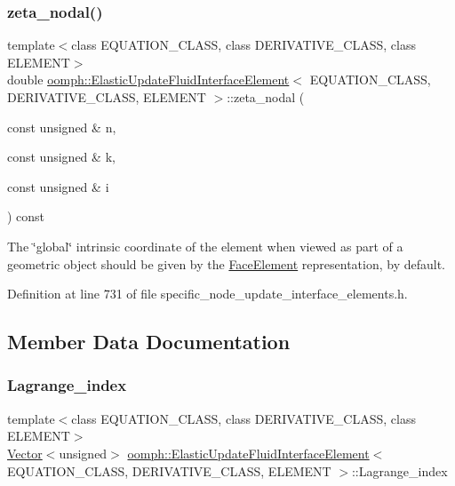 \subsubsection{\texorpdfstring{zeta\+\_\+nodal()}{zeta\_nodal()}}
{\footnotesize\ttfamily template$<$class E\+Q\+U\+A\+T\+I\+O\+N\+\_\+\+C\+L\+A\+SS, class D\+E\+R\+I\+V\+A\+T\+I\+V\+E\+\_\+\+C\+L\+A\+SS, class E\+L\+E\+M\+E\+NT$>$ \\
double \hyperlink{classoomph_1_1ElasticUpdateFluidInterfaceElement}{oomph\+::\+Elastic\+Update\+Fluid\+Interface\+Element}$<$ E\+Q\+U\+A\+T\+I\+O\+N\+\_\+\+C\+L\+A\+SS, D\+E\+R\+I\+V\+A\+T\+I\+V\+E\+\_\+\+C\+L\+A\+SS, E\+L\+E\+M\+E\+NT $>$\+::zeta\+\_\+nodal (\begin{DoxyParamCaption}\item[{const unsigned \&}]{n,  }\item[{const unsigned \&}]{k,  }\item[{const unsigned \&}]{i }\end{DoxyParamCaption}) const\hspace{0.3cm}{\ttfamily [inline]}}



The \char`\"{}global\char`\"{} intrinsic coordinate of the element when viewed as part of a geometric object should be given by the \hyperlink{classoomph_1_1FaceElement}{Face\+Element} representation, by default. 



Definition at line 731 of file specific\+\_\+node\+\_\+update\+\_\+interface\+\_\+elements.\+h.



\subsection{Member Data Documentation}
\mbox{\label{classoomph_1_1ElasticUpdateFluidInterfaceElement_a7852050a89e3aac51ed3693814be9018}} 
\subsubsection{\texorpdfstring{Lagrange\+\_\+index}{Lagrange\_index}}
{\footnotesize\ttfamily template$<$class E\+Q\+U\+A\+T\+I\+O\+N\+\_\+\+C\+L\+A\+SS, class D\+E\+R\+I\+V\+A\+T\+I\+V\+E\+\_\+\+C\+L\+A\+SS, class E\+L\+E\+M\+E\+NT$>$ \\
\hyperlink{classoomph_1_1Vector}{Vector}$<$unsigned$>$ \hyperlink{classoomph_1_1ElasticUpdateFluidInterfaceElement}{oomph\+::\+Elastic\+Update\+Fluid\+Interface\+Element}$<$ E\+Q\+U\+A\+T\+I\+O\+N\+\_\+\+C\+L\+A\+SS, D\+E\+R\+I\+V\+A\+T\+I\+V\+E\+\_\+\+C\+L\+A\+SS, E\+L\+E\+M\+E\+NT $>$\+::Lagrange\+\_\+index\hspace{0.3cm}{\ttfamily [private]}}



